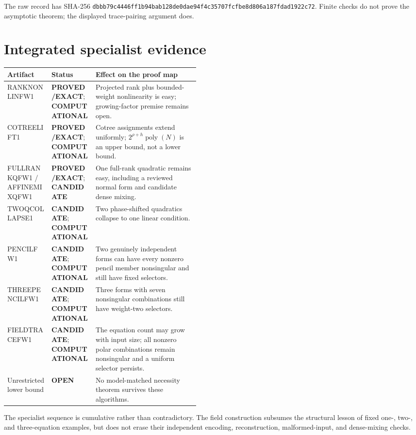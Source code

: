 \documentclass[11pt]{article}
\newcommand{\EXACT}{\textbf{PROVED/EXACT}}
\newcommand{\COMP}{\textbf{COMPUTATIONAL}}
\newcommand{\CAND}{\textbf{CANDIDATE}}
\newcommand{\OPEN}{\textbf{OPEN}}
\begin{document}
The raw record
has SHA-256
\texttt{dbbb79c4446ff1b94bab128de0dae94f4c35707fcfbe8d806a187fdad1922c72}.
Finite checks do not prove the asymptotic theorem; the displayed trace-pairing
argument does.

\section{Integrated specialist evidence}
\begin{center}
\begin{tabularx}{0.98\linewidth}{p{0.23\linewidth}p{0.23\linewidth}X}
\toprule
Artifact & Status & Effect on the proof map \\
\midrule
RANKNONLINFW1 & \EXACT{}; \COMP & Projected rank plus bounded-weight nonlinearity is easy; growing-factor premise remains open.\\
COTREELIFT1 & \EXACT{}; \COMP & Cotree assignments extend uniformly; $2^{\rho+h}\operatorname{poly}(N)$ is an upper bound, not a lower bound.\\
FULLRANKQFW1 / AFFINEMIXQFW1 & \EXACT{}; \CAND & One full-rank quadratic remains easy, including a reviewed normal form and candidate dense mixing.\\
TWOQCOLLAPSE1 & \CAND{}; \COMP & Two phase-shifted quadratics collapse to one linear condition.\\
PENCILFW1 & \CAND{}; \COMP & Two genuinely independent forms can have every nonzero pencil member nonsingular and still have fixed selectors.\\
THREEPENCILFW1 & \CAND{}; \COMP & Three forms with seven nonsingular combinations still have weight-two selectors.\\
FIELDTRACEFW1 & \CAND{}; \COMP & The equation count may grow with input size; all nonzero polar combinations remain nonsingular and a uniform selector persists.\\
Unrestricted lower bound & \OPEN & No model-matched necessity theorem survives these algorithms.\\
\bottomrule
\end{tabularx}
\end{center}

The specialist sequence is cumulative rather than contradictory.  The field
construction subsumes the structural lesson of fixed one-, two-, and
three-equation examples, but does not erase their independent encoding,
reconstruction, malformed-input, and dense-mixing checks.
\end{document}
